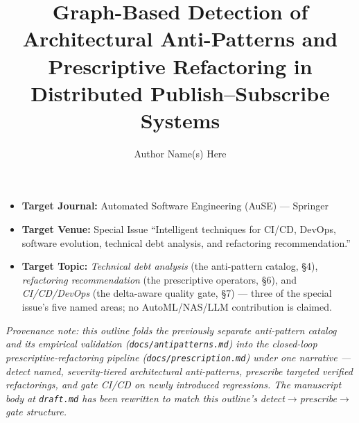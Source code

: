 \documentclass[11pt]{article}
\title{Graph-Based Detection of Architectural Anti-Patterns and Prescriptive Refactoring in
Distributed Publish--Subscribe Systems}
\author{Author Name(s) Here}
\date{}
\begin{document}
\maketitle

\begin{itemize}[leftmargin=*]
\item \textbf{Target Journal:} Automated Software Engineering (AuSE) --- Springer
\item \textbf{Target Venue:} Special Issue ``Intelligent techniques for CI/CD, DevOps, software
  evolution, technical debt analysis, and refactoring recommendation.''
\item \textbf{Target Topic:} \emph{Technical debt analysis} (the anti-pattern catalog, \S4),
  \emph{refactoring recommendation} (the prescriptive operators, \S6), and \emph{CI/CD/DevOps} (the
  delta-aware quality gate, \S7) --- three of the special issue's five named areas; no AutoML/NAS/LLM
  contribution is claimed.
\end{itemize}

\noindent\emph{Provenance note: this outline folds the previously separate anti-pattern catalog and
its empirical validation (\texttt{docs/antipatterns.md}) into the closed-loop
prescriptive-refactoring pipeline (\texttt{docs/prescription.md}) under one narrative --- detect
named, severity-tiered architectural anti-patterns, prescribe targeted verified refactorings, and
gate CI/CD on newly introduced regressions. The manuscript body at \texttt{draft.md} has been
rewritten to match this outline's detect$\to$prescribe$\to$gate structure.}
\end{document}
